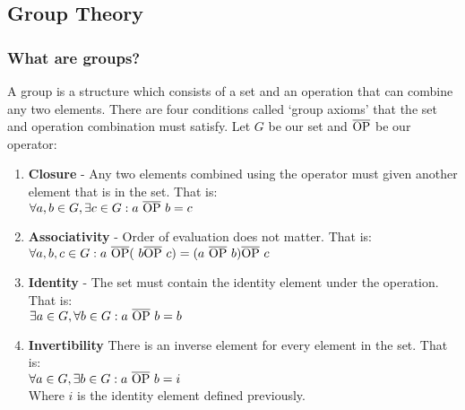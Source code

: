 \documentclass[titlepage]{report}[12pt]
\begin{document}
\subsection{Group Theory}
\subsubsection{What are groups?}
A group is a structure which consists of a set and an operation that can combine any two elements. There are four conditions called `group axioms' that the set and operation combination must satisfy. Let \begin{math} G \end{math} be our set and \begin{math}\overline{\rm OP} \end{math} be our operator:
\begin{enumerate}
\item \textbf{Closure} - Any two elements combined using the operator must given another element that is in the set. That is:
\\
\begin{math} \forall a,b \in G, \exists c \in G: a\ \overline{\rm OP} \ b = c\end{math}

\item \textbf{Associativity} - Order of evaluation does not matter. That is: 
\\
\begin{math} \forall a,b,c \in G: a\ \overline{\rm OP} (\ b \overline{\rm OP} \ c) = (a\ \overline{\rm OP} \ b) \overline{\rm OP} \ c \end{math}

\item \textbf{Identity} - The set must contain the identity element under the operation. That is: 
\\
\begin{math} \exists a \in G, \forall b \in G: a\ \overline{\rm OP} \ b = b \end{math}

\item \textbf{Invertibility} There is an inverse element for every element in the set. That is:
\\
\begin{math} \forall a \in G, \exists b \in G: a\ \overline{\rm OP} \ b = i \end{math} 
\\ Where \begin{math} i \end{math} is the identity element defined previously.
\end{enumerate}
\end{document}
